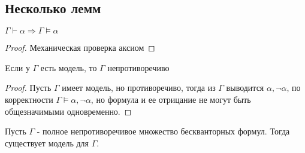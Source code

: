 \subsection{Несколько лемм}
\label{sec-8-4}
\begin{lemma}
$\Gamma \vdash \alpha \Rightarrow \Gamma \models \alpha$
\end{lemma}
\begin{proof}
Механическая проверка аксиом
\end{proof}
\begin{lemma}
Eсли у $\Gamma$ есть модель, то $\Gamma$ непротиворечиво
\end{lemma}
\begin{proof}
Пусть $\Gamma$ имеет модель, но противоречиво, тогда из $\Gamma$ выводится $\alpha, \neg \alpha$, по корректности $\Gamma \models \alpha, \neg \alpha$, но формула и ее отрицание не могут быть общезначимыми одновременно.
\end{proof}
\begin{lemma}
Пусть $\Gamma$ - полное непротиворечивое множество бескванторных формул. Тогда существует модель для $\Gamma$.
\end{lemma}
